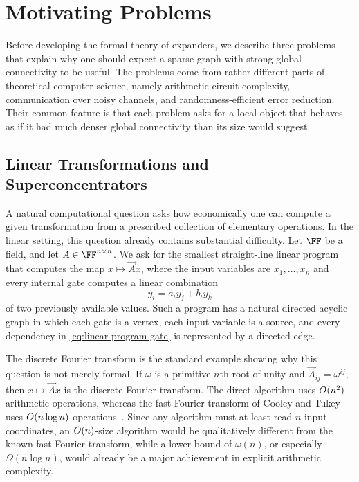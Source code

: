 \section{Motivating Problems}
\label{sec:motivating-problems}

Before developing the formal theory of expanders, we describe three problems that explain why one should expect a sparse graph with strong global connectivity to be useful. The problems come from rather different parts of theoretical computer science, namely arithmetic circuit complexity, communication over noisy channels, and randomness-efficient error reduction. Their common feature is that each problem asks for a local object that behaves as if it had much denser global connectivity than its size would suggest.

\subsection{Linear Transformations and Superconcentrators}
\label{subsec:linear-transformations-superconcentrators}

A natural computational question asks how economically one can compute a given transformation from a prescribed collection of elementary operations. In the linear setting, this question already contains substantial difficulty. Let \(\FF\) be a field, and let \(\vec{A}\in \FF^{n\times n}\). We ask for the smallest straight-line linear program that computes the map \(x\mapsto \vec{A}x\), where the input variables are \(x_1,\ldots,x_n\) and every internal gate computes a linear combination
\begin{equation}
	\label{eq:linear-program-gate}
	y_i=a_i y_j+b_i y_k
\end{equation}
of two previously available values. Such a program has a natural directed acyclic graph in which each gate is a vertex, each input variable is a source, and every dependency in \cref{eq:linear-program-gate} is represented by a directed edge.

The discrete Fourier transform is the standard example showing why this question is not merely formal. If \(\omega\) is a primitive \(n\)th root of unity and \(\vec{A}_{ij}=\omega^{ij}\), then \(x\mapsto \vec{A}x\) is the discrete Fourier transform. The direct algorithm uses \(\bigO(n^2)\) arithmetic operations, whereas the fast Fourier transform of Cooley and Tukey uses \(\bigO(n\log n)\) operations~\cite{CT1965}. Since any algorithm must at least read \(n\) input coordinates, an \(\bigO(n)\)-size algorithm would be qualitatively different from the known fast Fourier transform, while a lower bound of \(\omega(n)\), or especially \(\Omega(n\log n)\), would already be a major achievement in explicit arithmetic complexity.

